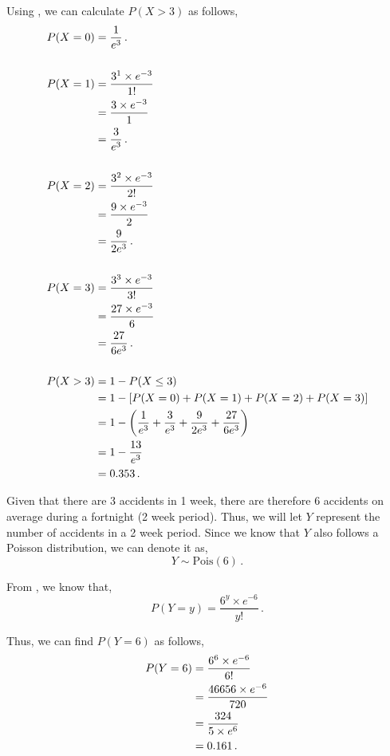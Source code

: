 \begin{subquestions}
\begin{subsubquestions}
Using , we can calculate $P(X>3)$ as follows,
\begin{align}
	P(X=0) & = \frac{1}{e^3} \,. \\ \nonumber \\
	P(X=1) & = \frac{ 3^1 \times e^{-3}}{1!} \nonumber \\
	       & = \frac{3 \times e^{-3}}{1} \nonumber \\
	       & = \frac{3}{e^3} \,. \\ \nonumber \\
	P(X=2) & = \frac{ 3^2 \times e^{-3}}{2!} \nonumber \\
	       & = \frac{9 \times e^{-3}}{2} \nonumber \\
	       & = \frac{9}{2e^3} \,. \\ \nonumber \\
	P(X=3) & = \frac{ 3^3 \times e^{-3}}{3!} \nonumber \\
	       & = \frac{27 \times e^{-3}}{6} \nonumber \\
	       & = \frac{27}{6e^3} \,. \\ \nonumber \\
	P(X>3) & =1-P(X \leq 3) \nonumber \\
		   & = 1 - [P(X=0)+P(X=1)+P(X=2)+P(X=3)] \nonumber \\
		   & = 1 - \left(\frac{1}{e^3} + \frac{3}{e^3} + \frac{9}{2e^3} + \frac{27}{6e^3} \right) \nonumber \\
		   & = 1 - \frac{13}{e^3} \nonumber \\
		   & = 0.353 \,.
\end{align}


Given that there are 3 accidents in 1 week, there are therefore 6 accidents on average during a fortnight (2 week period). Thus, we will let $Y$ represent the number of accidents in a 2 week period. Since we know that $Y$ also follows a Poisson distribution, we can denote it as,
\begin{equation}
	Y \sim \text{Pois}(6) \,.
\end{equation} 

From , we know that,
\begin{equation}
	P(Y = y) =\frac{ 6 ^ y \times e^{-6}}{y!} \,.
\end{equation}

Thus, we can find $P(Y=6)$ as follows,
\begin{align}
	P(Y = 6) & = \frac{ 6 ^ 6 \times e^{-6}}{6!} \nonumber \\	
	         & = \frac{46656 \times e^{-6}}{720} \nonumber \\
	         & = \frac{324}{5 \times e^6} \nonumber \\
	         & = 0.161 \,.
\end{align}


\end{subsubquestions}
\end{subquestions}
